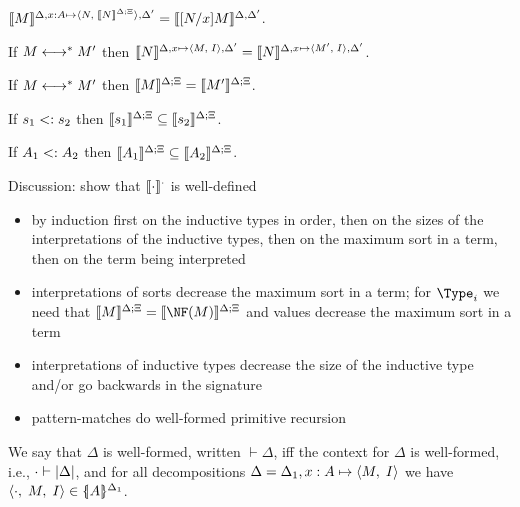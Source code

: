 \documentclass[conference]{IEEEtran}
\begin{document}
\begin{lemma}[Substitution]
  \label{lemma:interp-subst}
  $\interp[\Delta,x:A\mapsto\pair{N}{\interp{N}},\Delta']{M}=
  \interp[\Delta,\Delta']{[N/x]M}$.
\end{lemma}


\begin{lemma}
  \label{lemma:delta-eq}
  If $M\conv M'$ then
  $\interp[\Delta,x\mapsto\pair{M}{I},\Delta']{N}=
  \interp[\Delta,x\mapsto\pair{M'}{I},\Delta']{N}$.
\end{lemma}

\begin{lemma}
  \label{lemma:interp-eq}
  If $M\conv M'$ then $\interp{M}=\interp{M'}$.
\end{lemma}


\begin{lemma}
  \label{lemma:sort-subtyping}
  If $s_1\subtype s_2$ then $\interp{s_1}\subseteq\interp{s_2}$.
\end{lemma}

\begin{lemma}
  \label{lemma:subtyping}
  If $A_1\subtype A_2$ then $\interp{A_1}\subseteq\interp{A_2}$.
\end{lemma}



Discussion: show that $\interp[\cdot]{\cdot}$ is well-defined
\begin{itemize}
\item by induction first on the inductive types in order, then on the
  sizes of the interpretations of the inductive types, then on the
  maximum sort in a term, then on the term being interpreted
\item interpretations of sorts decrease the maximum sort in a term;
  for $\Type_i$ we need that $\interp{M}=\interp{\NF(M)}$
  and values decrease the maximum sort in a term
\item interpretations of inductive types decrease the size of the
  inductive type and/or go backwards in the signature
\item pattern-matches do well-formed primitive recursion
\end{itemize}




We say that $\Delta$ is well-formed, written $\vdash\Delta$, iff the
context for $\Delta$ is well-formed, i.e.,
$\validj[\cdot]{\dctxt{\Delta}}$, and for all decompositions
$\Delta=\Delta_1,x:A\mapsto\pair{M}{I}$ we have
$\triple{\cdot}{M}{I}\in\interpd[\Delta_1]{A}$.
\end{document}
